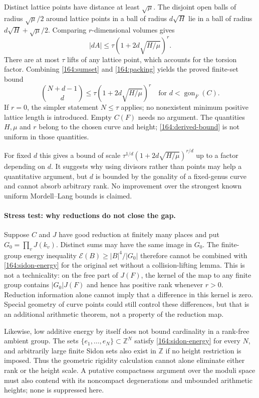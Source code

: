 \documentclass[11pt,a4paper]{article}
\newcommand{\Z}{\mathbb{Z}}
\numberwithin{equation}{section}
\begin{document}
Distinct lattice points have distance at least $\sqrt\mu$.
The disjoint open balls of radius $\sqrt\mu/2$ around lattice points in
a ball of radius $d\sqrt H$ lie in a ball of radius
$d\sqrt H+\sqrt\mu/2$. Comparing $r$-dimensional volumes gives
\begin{equation}\label{164:packing}
 |dA|\le\tau\left(1+2d\sqrt{H/\mu}\right)^r.
\end{equation}
There are at most $\tau$ lifts of any lattice point, which accounts for
the torsion factor. Combining \eqref{164:sumset} and
\eqref{164:packing} yields the proved finite-set bound
\begin{equation}\label{164:derived-bound}
 \boxed{\displaystyle
 \binom{N+d-1}{d}\le
 \tau\left(1+2d\sqrt{H/\mu}\right)^r
 \quad\text{for }d<\operatorname{gon}_{\overline F}(C).}
\end{equation}
If $r=0$, the simpler statement $N\le\tau$ applies; no nonexistent
minimum positive lattice length is introduced. Empty $C(F)$ needs no
argument. The quantities $H,\mu$ and $r$ belong to the chosen curve and
height; \eqref{164:derived-bound} is not uniform in those quantities.

For fixed $d$ this gives a bound of scale
$\tau^{1/d}(1+2d\sqrt{H/\mu})^{r/d}$ up to a factor depending on $d$.
It suggests why using divisors rather than points may help a quantitative
argument, but $d$ is bounded by the gonality of a fixed-genus curve and
cannot absorb arbitrary rank. No improvement over the strongest known
uniform Mordell--Lang bounds is claimed.

\paragraph{Stress test: why reductions do not close the gap.}
Suppose $C$ and $J$ have good reduction at finitely many places and put
$G_0=\prod_v J(k_v)$. Distinct sums may have the same image in $G_0$.
The finite-group energy inequality
$\mathcal E(B)\ge |B|^4/|G_0|$ therefore cannot be combined with
\eqref{164:sidon-energy} for the original set without a collision-lifting
lemma. This is not a technicality: on the free part of $J(F)$, the
kernel of the map to any finite group contains $|G_0|J(F)$ and hence has
positive rank whenever $r>0$. Reduction information alone cannot imply
that a difference in this kernel is zero. Special geometry of curve
points could still control these differences, but that is an additional
arithmetic theorem, not a property of the reduction map.

Likewise, low additive energy by itself does not bound cardinality in a
rank-free ambient group. The sets $\{e_1,\ldots,e_N\}\subset\Z^N$ satisfy
\eqref{164:sidon-energy} for every $N$, and arbitrarily large finite
Sidon sets also exist in $\Z$ if no height restriction is imposed. Thus
the geometric rigidity calculation cannot alone eliminate either rank
or the height scale. A putative compactness argument over the moduli
space must also contend with its noncompact degenerations and unbounded
arithmetic heights; none is suppressed here.
\end{document}
